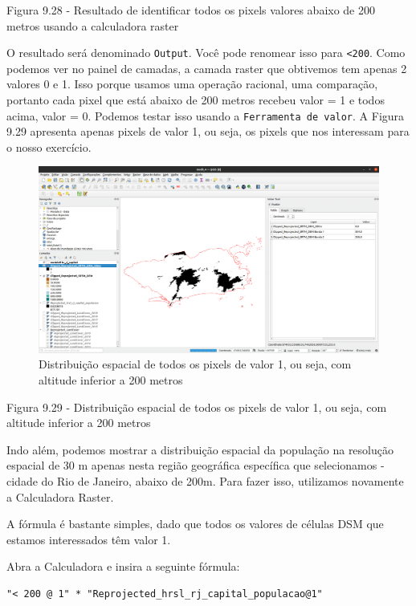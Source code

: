 \documentclass[
]{krantz}
\begin{document}
Figura 9.28 - Resultado de identificar todos os pixels valores abaixo de 200 metros usando a calculadora raster

O resultado será denominado \texttt{Output}. Você pode renomear isso para \texttt{\textless{}200}. Como podemos ver no painel de camadas, a camada raster que obtivemos tem apenas 2 valores 0 e 1. Isso porque usamos uma operação racional, uma comparação, portanto cada pixel que está abaixo de 200 metros recebeu valor = 1 e todos acima, valor = 0. Podemos testar isso usando a \texttt{Ferramenta\ de\ valor}. A Figura 9.29 apresenta apenas pixels de valor 1, ou seja, os pixels que nos interessam para o nosso exercício.

\begin{figure}
\centering
\includegraphics{media/modulo9/fig929.png}
\caption{Distribuição espacial de todos os pixels de valor 1, ou seja, com altitude inferior a 200 metros}
\end{figure}

Figura 9.29 - Distribuição espacial de todos os pixels de valor 1, ou seja, com altitude inferior a 200 metros

Indo além, podemos mostrar a distribuição espacial da população na resolução espacial de 30 m apenas nesta região geográfica específica que selecionamos - cidade do Rio de Janeiro, abaixo de 200m. Para fazer isso, utilizamos novamente a Calculadora Raster.

A fórmula é bastante simples, dado que todos os valores de células DSM que estamos interessados \hspace{0pt}\hspace{0pt}têm valor 1.

Abra a Calculadora e insira a seguinte fórmula:

\begin{verbatim}
"< 200 @ 1" * "Reprojected_hrsl_rj_capital_populacao@1"
\end{verbatim}
\end{document}
